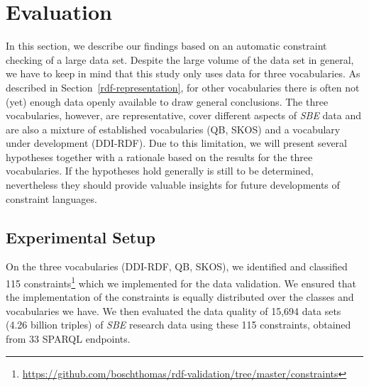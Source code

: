 \documentclass[conference]{IEEEtran}
\newcommand{\ke}[1]{\todo[size=\small, color=red!40]{\textbf{Kai:} #1}}
\begin{document}
\section{Evaluation}
\label{evaluation}

In this section, we describe our findings based on an automatic constraint checking of a large data set. Despite the large volume of the data set in general, we have to keep in mind that this study only uses data for three vocabularies. As described in Section~\ref{rdf-representation}, for other vocabularies there is often not (yet) enough data openly available to draw general conclusions. The three vocabularies, however, are representative, cover different aspects of \emph{SBE} data and are also a mixture of established vocabularies (QB, SKOS) and a vocabulary under development (DDI-RDF). Due to this limitation, we will present several hypotheses together with a rationale based on the results for the three vocabularies. If the hypotheses hold generally is still to be determined, nevertheless they should provide valuable insights for future developments of constraint languages.

\subsection{Experimental Setup}
\label{implementation}


On the three vocabularies (DDI-RDF, QB, SKOS), we identified and classified 115 constraints\footnote{\url{https://github.com/boschthomas/rdf-validation/tree/master/constraints}} which we implemented for the data validation. We ensured that the implementation of the constraints is equally distributed over the classes and vocabularies we have. We then evaluated the data quality of 15,694 data sets (4.26 billion triples) of \emph{SBE} research data using these 115 constraints, obtained from 33 SPARQL endpoints.
\end{document}
